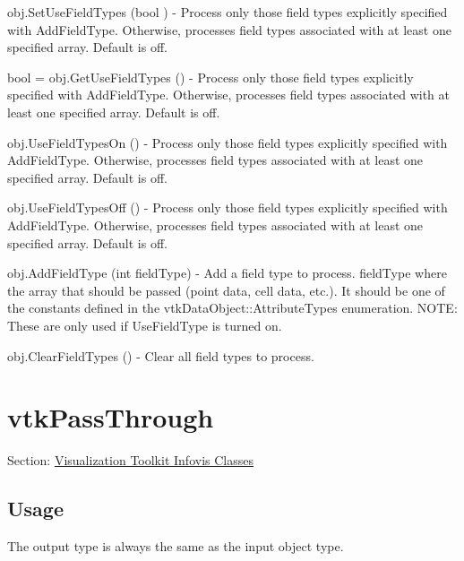 \begin{DoxyItemize}
\item {\ttfamily obj.\-Set\-Use\-Field\-Types (bool )} -\/ Process only those field types explicitly specified with Add\-Field\-Type. Otherwise, processes field types associated with at least one specified array. Default is off.  
\item {\ttfamily bool = obj.\-Get\-Use\-Field\-Types ()} -\/ Process only those field types explicitly specified with Add\-Field\-Type. Otherwise, processes field types associated with at least one specified array. Default is off.  
\item {\ttfamily obj.\-Use\-Field\-Types\-On ()} -\/ Process only those field types explicitly specified with Add\-Field\-Type. Otherwise, processes field types associated with at least one specified array. Default is off.  
\item {\ttfamily obj.\-Use\-Field\-Types\-Off ()} -\/ Process only those field types explicitly specified with Add\-Field\-Type. Otherwise, processes field types associated with at least one specified array. Default is off.  
\item {\ttfamily obj.\-Add\-Field\-Type (int field\-Type)} -\/ Add a field type to process. field\-Type where the array that should be passed (point data, cell data, etc.). It should be one of the constants defined in the vtk\-Data\-Object\-::\-Attribute\-Types enumeration. N\-O\-T\-E\-: These are only used if Use\-Field\-Type is turned on.  
\item {\ttfamily obj.\-Clear\-Field\-Types ()} -\/ Clear all field types to process.  
\end{DoxyItemize}\hypertarget{vtkinfovis_vtkpassthrough}{}\section{vtk\-Pass\-Through}\label{vtkinfovis_vtkpassthrough}
Section\-: \hyperlink{sec_vtkinfovis}{Visualization Toolkit Infovis Classes} \hypertarget{vtkwidgets_vtkxyplotwidget_Usage}{}\subsection{Usage}\label{vtkwidgets_vtkxyplotwidget_Usage}
The output type is always the same as the input object type.

